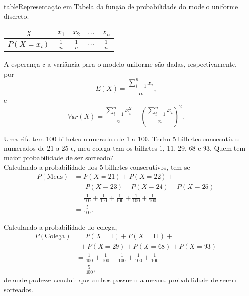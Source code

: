 \documentclass[11pt,fleqn]{book}
\numberwithin{mpicture}{chapter}
\numberwithin{mtable}{chapter}
\numberwithin{mframe}{chapter}
\begin{document}
\begin{sidepicture}{5cm}{table}{Representação em Tabela da função de probabilidade do modelo uniforme discreto.}
	\label{table:describe_func_probabilidade_uniforme_discreto}
	\begin{tabular}{c|cccc}\toprule  
		$X$ & $x_1$ & $x_2$ & $\dots$ & $x_n$ \\ \midrule
		$P(X=x_i)$ & $\frac{1}{n}$ & $\frac{1}{n}$ & $\dots$ & $\frac{1}{n}$\\\bottomrule
	\end{tabular}
\end{sidepicture}

A esperança e a variância para o modelo uniforme são dadas, respectivamente, por
\begin{equation}
	E(X)=\frac{\displaystyle\sum_{i=1}^{n}x_i}{n}\text{,}
\end{equation}
e
\begin{equation}
	Var(X)=\frac{\displaystyle\sum_{i=1}^{n} x_i^2}{n} - \left (
		\frac{\displaystyle \sum_{i=1}^{n} x_i}{n}
	\right )^2\text{.}
\end{equation}




\begin{example}
	Uma rifa tem 100 bilhetes numerados de 1 a 100. Tenho 5 bilhetes consecutivos numerados de 21 a 25 e, meu colega tem os bilhetes 1, 11, 29, 68 e 93. Quem tem maior probabilidade de ser sorteado?\\
	
	Calculando a probabilidade dos 5 bilhetes consecutivos, tem-se
	\begin{align*}
		P(\text{Meus})&=P(X=21)+P(X=22)+\\
					  &\hspace{5pt}+P(X=23)+P(X=24)+P(X=25)\\
					  &=\frac{1}{100}+\frac{1}{100}+\frac{1}{100}+\frac{1}{100}+\frac{1}{100}\\
					  &=\frac{5}{100}\text{.}
	\end{align*}
	
	Calculando a probabilidade do colega,
	\begin{align*}
		P(\text{Colega})&=P(X=1)+P(X=11)+\\
						&\hspace{5pt}+P(X=29)+P(X=68)+P(X=93)\\
						&=\frac{1}{100}+\frac{1}{100}+\frac{1}{100}+\frac{1}{100}+\frac{1}{100}\\
					  &=\frac{5}{100}\text{,}
	\end{align*}
	de onde pode-se concluir que ambos possuem a mesma probabilidade de serem sorteados.
\end{example}
\end{document}
